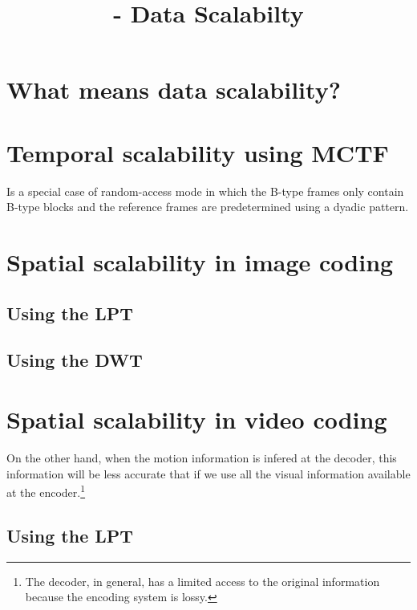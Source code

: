 


\title{\SM{} - Data Scalabilty}

\maketitle

\tableofcontents

\section{What means data scalability?}

\section{Temporal scalability using MCTF}

Is a special case of random-access mode in which the B-type frames
only contain B-type blocks and the reference frames are predetermined
using a dyadic pattern.

\section{Spatial scalability in image coding}

\subsection{Using the LPT}

\subsection{Using the DWT}

\section{Spatial scalability in video coding}

On the other hand, when the motion information is infered at the
decoder, this information will be less accurate that if we use all the
visual information available at the encoder.\footnote{The decoder, in
general, has a limited access to the original information because the
encoding system is lossy.}

\subsection{Using the LPT}


